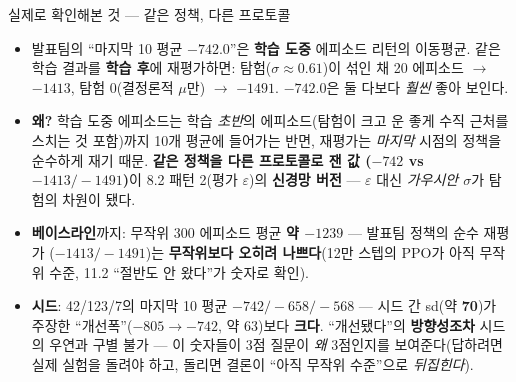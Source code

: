 \documentclass[aspectratio=169,11pt]{beamer}
\begin{document}
\begin{frame}{실제로 확인해본 것 — 같은 정책, 다른 프로토콜}
  \small
  \begin{itemize}
    \item 발표팀의 ``마지막 10 평균 $-742.0$''은 \textbf{학습 도중}
      에피소드 리턴의 이동평균. 같은 학습 결과를 \textbf{학습 후}에
      재평가하면: 탐험($\sigma\approx 0.61$)이 섞인 채 20 에피소드
      $\to$ \textbf{$-1413$}, 탐험 0(결정론적 $\mu$만) $\to$
      \textbf{$-1491$}. $-742.0$은 둘 다보다 \emph{훨씬} 좋아
      보인다.
    \item \textbf{왜?} 학습 도중 에피소드는 학습 \emph{초반}의
      에피소드(탐험이 크고 운 좋게 수직 근처를 스치는 것 포함)까지
      10개 평균에 들어가는 반면, 재평가는 \emph{마지막} 시점의 정책을
      순수하게 재기 때문. \textbf{같은 정책을 다른 프로토콜로 잰 값
      ($-742$ vs $-1413/-1491$)}이 8.2 패턴 2(평가 $\varepsilon$)의
      \textbf{신경망 버전} — $\varepsilon$ 대신 \emph{가우시안
      $\sigma$}가 탐험의 차원이 됐다.
    \item \textbf{베이스라인}까지: 무작위 300 에피소드 평균
      \textbf{약 $-1239$} — 발표팀 정책의 순수 재평가
      ($-1413/-1491$)는 \textbf{무작위보다 오히려 나쁘다}(12만 스텝의
      PPO가 아직 무작위 수준, 11.2 ``절반도 안 왔다''가 숫자로 확인).
    \item \textbf{시드}: 42/123/7의 마지막 10 평균 \textbf{$-742/-658/-568$}
      — 시드 간 sd(약 \textbf{70})가 주장한 ``개선폭''($-805\to-742$, 약
      63)보다 \textbf{크다}. ``개선됐다''의 \textbf{방향성조차} 시드의
      우연과 구별 불가 — 이 숫자들이 3점 질문이 \emph{왜} 3점인지를
      보여준다(답하려면 실제 실험을 돌려야 하고, 돌리면 결론이
      ``아직 무작위 수준''으로 \emph{뒤집힌다}).
  \end{itemize}
\end{frame}
\end{document}
